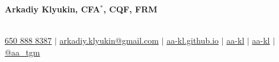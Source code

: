 \documentclass[letterpaper,hidelinks]{article}
\begin{document}


\begin{center}
  \textbf{\Huge{Arkadiy Klyukin, CFA$\mathbb{}^\ast$, CQF, FRM}\\} \\ \vspace{1pt}
 
  \small
  \faMobile* \hspace{.5pt} \href{tel:+16508888387}{650 888 8387}
  $|$
  \faAt \hspace{.5pt} \href{mailto:arkadiy.klyukin@gmail.com}{arkadiy.klyukin@gmail.com}
  $|$
  \faGlobeAmericas \hspace{.5pt} \href{https://aa-kl.github.io}{aa-kl.github.io}
  $|$
  \faGithub \hspace{.5pt} \href{https://github.com/aa-kl}{aa-kl}
  $|$
  \faLinkedinIn \hspace{.5pt} \href{https://www.linkedin.com/in/aa-kl}{aa-kl}
  $|$
  \faTelegramPlane \hspace{.5pt} \href{https://t.me/aa_tgm}{@aa\_tgm}
\end{center}



\vspace{-27pt}
\end{document}
